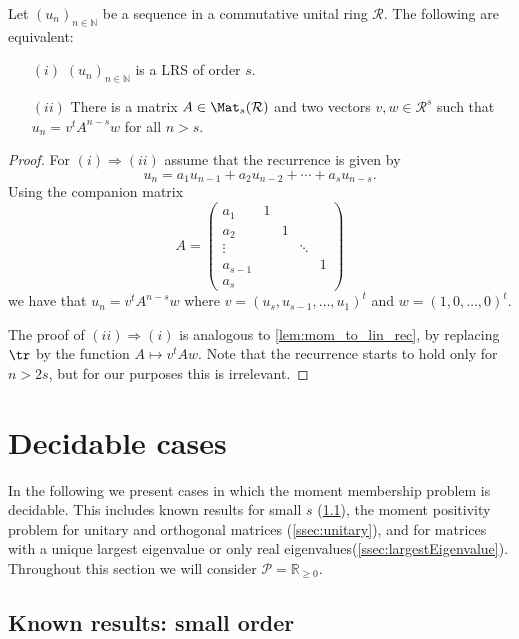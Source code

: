 \begin{lemma}\label{prop:lin_rec_equ_moment}
Let $(u_n)_{n \in \mathbb{N}}$ be a sequence in a commutative unital ring $\mathcal{R}$. The following are equivalent:
\begin{enumerate}
	\item[$(i)$] $(u_n)_{n \in \mathbb{N}}$ is a LRS of order $s$.
	\item[$(ii)$] There is a matrix $A \in \Mat_s(\mathcal{R})$ and two vectors $v,w \in \mathcal{R}^s$ such that $u_n = v^t A^{n-s} w$ for all  $n>s$.
\end{enumerate}
\end{lemma}
\begin{proof}
For $(i) \Rightarrow (ii)$ assume that the recurrence  is given by
$$u_n = a_1 u_{n-1} + a_2 u_{n-2} + \cdots + a_s u_{n-s}.$$ 
Using the companion matrix
$$A = \begin{pmatrix} a_1 & 1 & & &  \\ a_2 & & 1 & & \\  \vdots & & & \ddots & \\ a_{s-1} & & & & 1 \\ a_s & & & & \end{pmatrix} $$
we have that $u_{n} = v^t A^{n-s} w$ where
$ v = (u_s, u_{s-1}, \ldots, u_1)^t$  and $w = (1, 0, \ldots, 0)^t.$

The proof of $(ii) \Rightarrow (i)$ is analogous to \cref{lem:mom_to_lin_rec}, by replacing $\tr$ by the function $A \mapsto v^t A w$. Note that the recurrence starts to hold only for $n>2s$, but for our purposes this is irrelevant.\end{proof}



\section{Decidable cases}
\label{sec:decidable}


In the following we present cases in which the moment membership problem is decidable. This includes known results for small $s$ (\cref{ssec:known}), the moment positivity problem for unitary and orthogonal matrices (\cref{ssec:unitary}), and for matrices with a unique largest eigenvalue or only real eigenvalues(\cref{ssec:largestEigenvalue}). Throughout this section we will consider $\mathcal P=\mathbb R_{\geqslant 0}$.


\subsection{Known results: small order}
\label{ssec:known}

